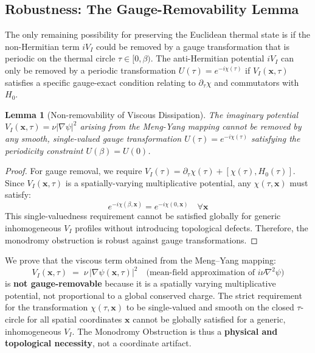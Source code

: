 \documentclass[11pt]{article}
\newtheorem{lemma}{Lemma}
\begin{document}
\subsection{Robustness: The Gauge-Removability Lemma}
\label{subsec:gauge-removability}

The only remaining possibility for preserving the Euclidean thermal state is if the non-Hermitian term $iV_I$ could be removed by a gauge transformation that is periodic on the thermal circle $\tau \in [0, \beta)$.
The anti-Hermitian potential $iV_I$ can only be removed by a periodic transformation $U(\tau)=e^{-i\chi(\tau)}$ if $V_I(\mathbf{x}, \tau)$ satisfies a specific gauge-exact condition relating to $\partial_\tau\chi$ and commutators with $H_0$.

\begin{lemma}[Non-removability of Viscous Dissipation]\label{lem:gauge-removability}
The imaginary potential $V_I(\mathbf{x},\tau) = \nu|\nabla\psi|^2$ arising from the Meng-Yang mapping
cannot be removed by any smooth, single-valued gauge transformation $U(\tau) = e^{-i\chi(\tau)}$
satisfying the periodicity constraint $U(\beta) = U(0)$.
\end{lemma}

\begin{proof}
For gauge removal, we require $V_I(\tau) = \partial_\tau\chi(\tau) + [\chi(\tau), H_0(\tau)]$.
Since $V_I(\mathbf{x},\tau)$ is a spatially-varying multiplicative potential, any $\chi(\tau,\mathbf{x})$
must satisfy:
\begin{equation}
e^{-i\chi(\beta,\mathbf{x})} = e^{-i\chi(0,\mathbf{x})} \quad \forall \mathbf{x}
\end{equation}
This single-valuedness requirement cannot be satisfied globally for generic inhomogeneous
$V_I$ profiles without introducing topological defects. Therefore, the monodromy obstruction
is robust against gauge transformations.
\end{proof}

We prove that the viscous term obtained from the Meng--Yang mapping:
\[
        V_I(\mathbf x,\tau) \;=\; \nu\,|\nabla\psi(\mathbf x,\tau)|^2 \quad \text{(mean-field approximation of $i\nu\nabla^2\psi$)}
\]
is \textbf{not gauge-removable} because it is a spatially varying multiplicative potential, not proportional to a global conserved charge. The strict requirement for the transformation $\chi(\tau, \mathbf{x})$ to be single-valued and smooth on the closed $\tau$-circle for all spatial coordinates $\mathbf{x}$ cannot be globally satisfied for a generic, inhomogeneous $V_I$. The Monodromy Obstruction is thus a \textbf{physical and topological necessity}, not a coordinate artifact.
\end{document}
